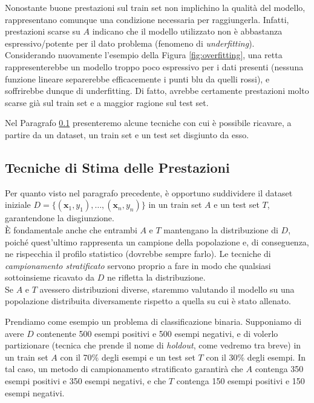 Nonostante buone prestazioni sul train set non implichino la qualità del modello, rappresentano comunque una condizione necessaria per raggiungerla. Infatti, prestazioni scarse su $A$ indicano che il modello utilizzato non è abbastanza espressivo/potente per il dato problema (fenomeno di \textit{underfitting}). \\
Considerando nuovamente l'esempio della Figura \ref{fig:overfitting}, una retta rappresenterebbe un modello troppo poco espressivo per i dati presenti (nessuna funzione lineare separerebbe efficacemente i punti blu da quelli rossi), e soffrirebbe dunque di underfitting. Di fatto, avrebbe certamente prestazioni molto scarse già sul train set e a maggior ragione sul test set.

Nel Paragrafo \ref{par:tecniche-di-stima} presenteremo alcune tecniche con cui è possibile ricavare, a partire da un dataset, un train set e un test set disgiunto da esso.

\subsection{Tecniche di Stima delle Prestazioni}
\label{par:tecniche-di-stima}
Per quanto visto nel paragrafo precedente, è opportuno suddividere il dataset iniziale $D = \{(\mathbf{x}_1, y_1), \dots, (\mathbf{x}_n, y_n)\}$ in un train set $A$ e un test set $T$, garantendone la disgiunzione. \\
È fondamentale anche che entrambi $A$ e $T$ mantengano la distribuzione di $D$, poiché quest'ultimo rappresenta un campione della popolazione e, di conseguenza, ne rispecchia il profilo statistico (dovrebbe sempre farlo). Le tecniche di \textit{campionamento stratificato} servono proprio a fare in modo che qualsiasi sottoinsieme ricavato da $D$ ne rifletta la distribuzione. \\
Se $A$ e $T$ avessero distribuzioni diverse, staremmo valutando il modello su una popolazione distribuita diversamente rispetto a quella su cui è stato allenato. 

Prendiamo come esempio un problema di classificazione binaria. Supponiamo di avere $D$ contenente 500 esempi positivi e 500 esempi negativi, e di volerlo partizionare (tecnica che prende il nome di \textit{holdout}, come vedremo tra breve) in un train set $A$ con il 70\% degli esempi e un test set $T$ con il 30\% degli esempi. In tal caso, un metodo di campionamento stratificato garantirà che $A$ contenga 350 esempi positivi e 350 esempi negativi, e che $T$ contenga 150 esempi positivi e 150 esempi negativi.

